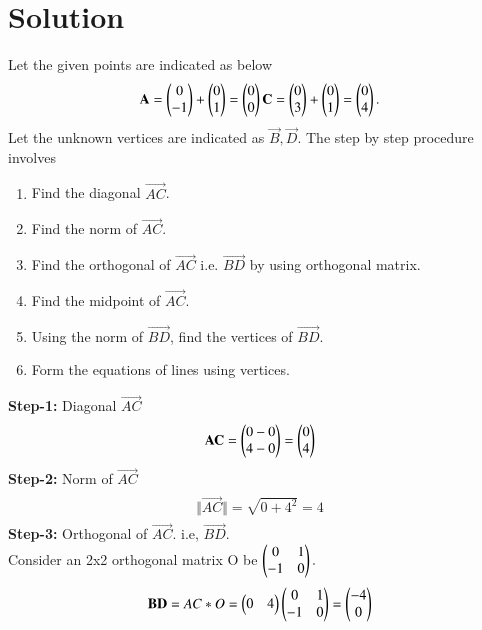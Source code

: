 \documentclass[journal,12pt,twocolumn]{IEEEtran}
\begin{document}
\section{Solution}
Let the given points are indicated as below\\
\begin{align}
\begin{split}
\mathbf{A} = \begin{pmatrix}0 \\ -1\end{pmatrix}  + \begin{pmatrix}0\\1\end{pmatrix} = \begin{pmatrix}0\\0\end{pmatrix}
\mathbf{C} = \begin{pmatrix}0 \\ 3\end{pmatrix} + \begin{pmatrix}0\\1\end{pmatrix} = \begin{pmatrix}0\\4\end{pmatrix}.\\
\end{split}
\end{align}
Let the unknown vertices are indicated as $ \vec{B},\vec{D}$. The step by step procedure involves
\begin{enumerate}
    \item Find the diagonal $\vec{AC}$.
    \item Find the norm of $\vec{AC}$.
    \item Find the orthogonal of $\vec{AC}$ i.e. $\vec{BD}$ by using orthogonal matrix.
    \item Find the midpoint of $\vec{AC}$.
    \item Using the norm of $\vec{BD}$, find the vertices of $\vec{BD}$.
    \item Form the equations of lines using vertices.
\end{enumerate}
\textbf{Step-1:} Diagonal $\vec{AC}$
\begin{align}
\begin{split}
\mathbf{AC} = \begin{pmatrix}0-0\\4-0\end{pmatrix} = \begin{pmatrix}0\\4\end{pmatrix}
\end{split}
\end{align}
\textbf{Step-2:} Norm of $\vec{AC}$
\begin{align}
\begin{split}
\Vert\vec{AC}\Vert = \sqrt{0+4^2} = 4
\end{split}
\end{align}
\textbf{Step-3:} Orthogonal of $\vec{AC}$. i.e, $\vec{BD}$.
\\
Consider an 2x2 orthogonal matrix O be $\begin{pmatrix}0&1\\-1&0\end{pmatrix}.$
\\
\begin{align}
\begin{split}
\mathbf{BD} =  AC * O =  \begin{pmatrix}0&4\end{pmatrix}  \begin{pmatrix}0&1\\-1&0\end{pmatrix} = \begin{pmatrix}-4\\0\end{pmatrix}
\end{split}
\end{align}
\end{document}
